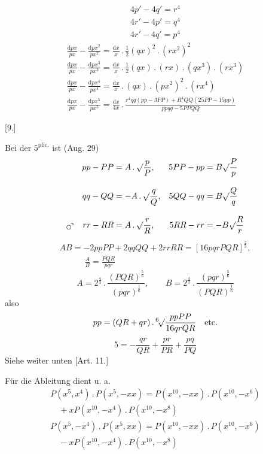 \[
\begin{gathered}
4p'-4q'=r^4\\[8pt]
4r'-4p'=q^4\\[8pt]
4r'-4q'=p^4
\end{gathered}
\]
\[
\begin{gathered}
\frac{\mathrm{d}px}{px}-\frac{\mathrm{d}px^2}{px^2}
=\frac{\mathrm{d}x}{x}\,.\,\tfrac12(qx)^2\,.\,(rx^2)^2\\[8pt]
\frac{\mathrm{d}px}{px}-\frac{\mathrm{d}px^3}{px^3}
=\frac{\mathrm{d}x}{x}\,.\,\tfrac12(qx)\,.\,(rx)\,.\,(qx^3)\,.\,(rx^3)\\[8pt]
\frac{\mathrm{d}px}{px}-\frac{\mathrm{d}px^4}{px^4}
=\frac{\mathrm{d}x}{x}\,.\,(qx)\,.\,(px^2)^2\,.\,(rx^4)\\[8pt]
\frac{\mathrm{d}px}{px}-\frac{\mathrm{d}px^5}{px^5}
=\frac{\mathrm{d}x}{4x}\,.\,
\frac{r^4qq(pp-3PP)+R^4QQ(25PP-15pp)}{ppqq-5PPQQ}
\end{gathered}
\]
\par\medskip{}\centerline{[9.]}\nobreak\smallskip
Bei der $5^{\mathrm{plic.}}$ ist (Aug. 29)
\[
\begin{aligned}
pp-PP&= A\,.\,\surd\frac{p}{P}, &5PP-pp&=B\surd\frac{P}{p}\\[8pt]
qq-QQ&=-A\,.\,\surd\frac{q}{Q}, &5QQ-qq&=B\surd\frac{Q}{q}\\[8pt]
\GaussCircleArrow\quad rr-RR&=A\,.\,\surd\frac{r}{R},
&5RR-rr&=-B\surd\frac{R}{r}
\end{aligned}
\]
\[
\begin{gathered}AB=-2ppPP+2qqQQ+2rrRR=[16pqrPQR]^{\frac23},
\\[8pt]\quad{}\qquad\frac{A}{B}=\frac{PQR}{pqr}\end{gathered}
\]
\[
A=2^{\frac43}\,.\,\frac{(PQR)^{\frac56}}{(pqr)^{\frac16}},
\qquad B=2^{\frac43}\,.\,\frac{(pqr)^{\frac56}}{(PQR)^{\frac16}}
\]
also
\[
pp=(QR+qr)\,.\,\mathord{{}^{6}\!\surd}\frac{ppPP}{16qrQR}\quad\text{etc.}
\]
\[
5=-\frac{qr}{QR}+\frac{pr}{PR}+\frac{pq}{PQ}
\]
Siehe weiter unten [Art. 11.]

Für die Ableitung dient u. a.
\[
\begin{gathered}
P(x^5,x^4)\,.\,P(x^5,-xx)
=P(x^{10},-xx)\,.\,P(x^{10},-x^6)\\[8pt]\quad{}+xP(x^{10},-x^4)\,.\,P(x^{10},-x^8)\\[8pt]
P(x^5,-x^4)\,.\,P(x^5,xx)
=P(x^{10},-xx)\,.\,P(x^{10},-x^6)\\[8pt]\quad{}-xP(x^{10},-x^4)\,.\,
P(x^{10},-x^8)
\end{gathered}
\]

